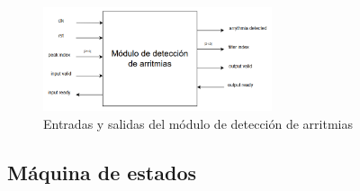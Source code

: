 \begin{figure}[h!]
    \centering
    \includegraphics[width=0.6\textwidth]{./Images/img_implementacion_hw/diagramamodulodeteccionarritmias.png}
    \caption{Entradas y salidas del módulo de detección de arritmias}
    \label{fig:moddeteccionarritmias}
\end{figure} 

\subsection{Máquina de estados}

